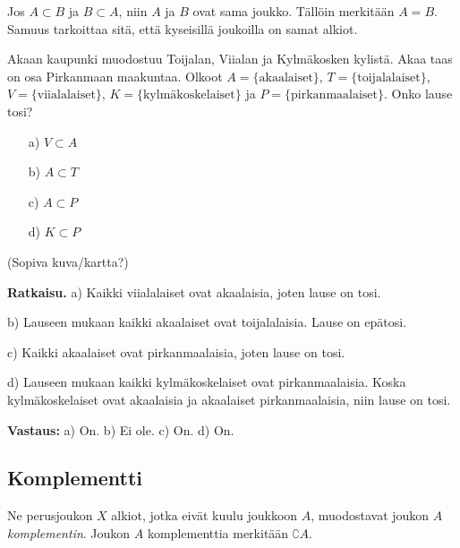 Jos $A\subset B$ ja $B\subset A$, niin  $A$ ja $B$ ovat sama joukko. Tällöin merkitään $A=B$. Samuus tarkoittaa sitä, että kyseisillä joukoilla on samat alkiot. %

\begin{esimerkki}
Akaan kaupunki muodostuu Toijalan, Viialan ja Kylmäkosken
kylistä. Akaa taas on osa Pirkanmaan maakuntaa. Olkoot $A
= \{\textrm{akaalaiset}\}$, $T = \{\textrm{toijalalaiset}\}$, $V
= \{\textrm{viialalaiset}\}$, $K = \{\textrm{kylmäkoskelaiset}\} $ ja $P = \{\textrm{pirkanmaalaiset}\}$. Onko lause tosi?

\begin{itemize}
\item[a)] $V \subset A$
\item[b)] $A \subset T$
\item[c)] $A \subset P$
\item[d)] $K \subset P$
\end{itemize}

(Sopiva kuva/kartta?)

{\bf Ratkaisu.}
a) Kaikki viialalaiset ovat akaalaisia, joten lause on
tosi.

b) Lauseen mukaan kaikki akaalaiset ovat toijalalaisia.
Lause on epätosi.

c) Kaikki akaalaiset ovat pirkanmaalaisia, joten lause on
tosi.

d) Lauseen mukaan kaikki kylmäkoskelaiset ovat
pirkanmaalaisia. Koska kylmäkoskelaiset ovat akaalaisia
ja akaalaiset pirkanmaalaisia, niin lause on tosi.

{\bf Vastaus:} a) On. b) Ei ole. c) On. d) On.
\end{esimerkki}

\subsection*{Komplementti}
Ne perusjoukon $X$ alkiot, jotka eivät kuulu joukkoon $A$, muodostavat joukon $A$ {\em komplementin}. Joukon $A$ komplementtia merkitään $\complement A$.

\begin{center}




\end{center}


